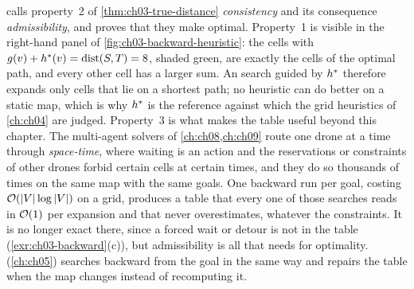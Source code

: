  calls property~2 of \cref{thm:ch03-true-distance} \emph{consistency} and its
consequence \emph{admissibility}, and proves that they make \astar optimal. Property~1 is
visible in the right-hand panel of \cref{fig:ch03-backward-heuristic}: the cells with
$g(v)+h^*(v)=\operatorname{dist}(S,T)=8$, shaded green, are exactly the cells of the optimal path,
and every other cell has a larger sum. An \astar search guided by $h^*$ therefore expands
only cells that lie on a shortest path; no heuristic can do better on a static map, which is
why $h^*$ is the reference against which the grid heuristics of \cref{ch:ch04} are judged.
Property~3 is what makes the table useful beyond this chapter. The multi-agent solvers of
\cref{ch:ch08,ch:ch09} route one drone at a time through \emph{space-time}, where waiting is
an action and the reservations or constraints of other drones forbid certain cells at certain
times, and they do so thousands of times on the same map with the same goals. One backward run
per goal, costing $\mathcal{O}\!\left(\left\lvert V \right\rvert\log\left\lvert V \right\rvert\right)$ on a grid, produces a table that every one of
those searches reads in $\mathcal{O}\!\left(1\right)$ per expansion and that never overestimates, whatever the
constraints. It is no longer exact there, since a forced wait or detour is not in the table
(\cref{exr:ch03-backward}(c)), but admissibility is all that \astar needs for optimality.
\dstarlite (\cref{ch:ch05}) searches backward from the goal in the same way and repairs the
table when the map changes instead of recomputing it.

